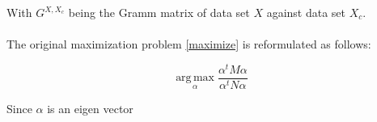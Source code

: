 With $G^{X, X_c}$ being the Gramm matrix of data set $X$ against data set $X_c$.

\paragraph{}
The original maximization problem \ref{maximize} is reformulated as follows:

\begin{equation*}
\label{maximize2}
\boxed{\operatorname*{arg\,max}_\alpha \frac{\alpha^t M \alpha}{\alpha^t N \alpha}}
\end{equation*}

Since $\alpha$ is an eigen vector 





